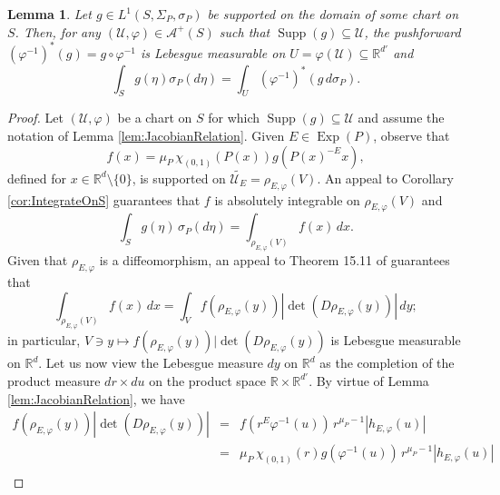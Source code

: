 \documentclass[11pt, letter]{book}
\newtheorem{lemma}[theorem]{Lemma}
\newcommand\Exp{\operatorname{Exp}}
\newcommand\supp{\operatorname{Supp}}
\renewcommand\det{\operatorname{det}}
\begin{document}
\begin{framed}
\begin{lemma}\label{lem:LocalIntegralFormula}
Let $g\in L^1(S,\Sigma_P,\sigma_P)$ be supported on the domain of some chart on $S$. Then, for any $(\mathcal{U},\varphi)\in\mathcal{A}^+(S)$ such that  $\supp(g)\subseteq\mathcal{U}$, the pushforward $(\varphi^{-1})^*(g)=g\circ\varphi^{-1}$ is Lebesgue measurable on $U=\varphi(\mathcal{U})\subseteq\mathbb{R}^{d'}$ and 
\begin{equation*}
\int_S g(\eta)\sigma_P(d\eta)=\int_{U}(\varphi^{-1})^*(g\, d\sigma_P).
\end{equation*}
\end{lemma}
\end{framed}
\begin{proof}
Let $(\mathcal{U},\varphi)$ be a chart on $S$ for which $\supp(g)\subseteq \mathcal{U}$ and assume the notation of Lemma \ref{lem:JacobianRelation}. Given $E\in\Exp(P)$, observe that
\begin{equation*}
    f(x)=\mu_P\, \chi_{(0,1)}(P(x))g(P(x)^{-E}x),
\end{equation*}
defined for $x\in\mathbb{R}^d\setminus\{0\}$, is supported on $\widetilde{\mathcal{U}_E}=\rho_{E,\varphi}(V)$. An appeal to Corollary \ref{cor:IntegrateOnS} guarantees that $f$ is absolutely integrable on $\rho_{E,\varphi}(V)$ and
\begin{equation}\label{eq:LocalIntegralFormula1}
\int_S g(\eta)\,\sigma_P(d\eta)=\int_{\rho_{E,\varphi}(V)}f(x)\,dx.
\end{equation}
Given that $\rho_{E,\varphi}$ is a diffeomorphism, an appeal to Theorem 15.11 of \cite{apostol_mathematical_1974} guarantees that
\begin{equation}\label{eq:LocalIntegralFormula2}
\int_{\rho_{E,\varphi}(V)}f(x)\,dx=\int_V f(\rho_{E,\varphi}(y))|\det(D\rho_{E,\varphi}(y))|\,dy;
\end{equation}
in particular, $V\ni y\mapsto f(\rho_{E,\varphi}(y))|\det(D\rho_{E,\varphi}(y))$ is Lebesgue measurable on $\mathbb{R}^{d}$. Let us now view the Lebesgue measure $dy$ on $\mathbb{R}^d$ as the completion of the product measure $dr\times du$ on the product space $\mathbb{R}\times\mathbb{R}^{d'}$. By virtue of Lemma \ref{lem:JacobianRelation}, we have
\begin{eqnarray}\label{eq:LocalIntegralFormula3}\nonumber
    f(\rho_{E,\varphi}(y))|\det(D\rho_{E,\varphi}(y))|
    &=& f(r^E\varphi^{-1}(u))\,r^{\mu_{P}-1}|h_{E,\varphi}(u)|\\ \nonumber
    &=& \mu_P\,\chi_{(0,1)}(r)g(\varphi^{-1}(u))\, r^{\mu_P-1}|h_{E,\varphi}(u)|\\ 

\end{eqnarray}
\end{proof}
\end{document}
